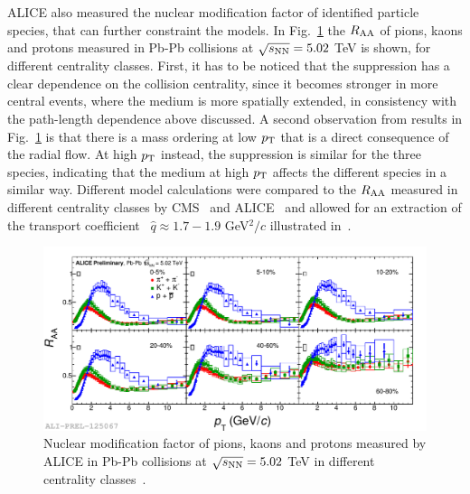 ALICE also measured the nuclear modification factor of identified particle species, that can further constraint the models. In Fig.~\ref{fig:PiKPRaa5TeV} the $R_{\rm AA}$ of pions, kaons and protons measured in Pb-Pb collisions at $\sqrt{s_{\rm NN}} = 5.02$ TeV is shown, for different centrality classes. First, it has to be noticed that the suppression has a clear dependence on the collision centrality, since it becomes stronger in more central events, where the medium is more spatially extended, in consistency with the path-length dependence above discussed. A second observation from results in Fig.~\ref{fig:PiKPRaa5TeV} is that there is a mass ordering at low $p_{\rm T}$ that is a direct consequence of the radial flow. At high $p_{\rm T}$ instead, the suppression is similar for the three species, indicating that the medium at high $p_{\rm T}$ affects the different species in a similar way. Different model calculations were compared to the $R_{\rm AA}$ measured in different centrality classes by CMS~\cite{CMS:2012aa} and ALICE~\cite{Abelev:2012hxa} and allowed for an extraction of the transport coefficient~\cite{Baier:1996sk} $\hat{q} \approx 1.7-1.9$ GeV$^2/c$ illustrated in~\cite{Burke:2013yra,Liu:2015vna}. 
\begin{figure}[!ht]
  \centering
  \includegraphics[width=15cm]{FigCap1/KPiPRAA5TeV.pdf}
  \caption{Nuclear modification factor of pions, kaons and protons measured by ALICE in Pb-Pb collisions at $\sqrt{s_{\rm NN}} = 5.02$ TeV in different centrality classes~\cite{Jacazio:2017dvy}.}
  \label{fig:PiKPRaa5TeV}
\end{figure}


